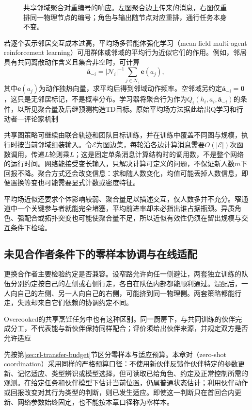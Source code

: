 \begin{figure}[htbp]
 \centering
 
 \caption{共享邻域聚合对重编号的响应。左图聚合边上传来的消息，右图仅重排同一物理节点的编号；角色与输出随节点对应重排，通行任务本身不变。}
 \label{fig:rl-multi-agent-graph}
\end{figure}

若逐个表示邻居交互成本过高，平均场多智能体强化学习（mean field multi-agent reinforcement learning）可用群体或邻域的平均行为近似它们的作用。例如，邻居具有共同离散动作含义且集合非空时，可计算
\[
 \bar{\bm a}_{-i}
 =|\mathcal N_i|^{-1}\sum_{j\in\mathcal N_i}\bm e(a_j),
\]
其中$\bm e(a_j)$为动作独热向量，求平均后得到邻域动作频率。空邻域另约定$\bar{\bm a}_{-i}=\bm0$，这只是无邻居标记，不是概率分布。学习器将聚合行为作为$Q_i(h_i,a_i,\bar{\bm a}_{-i})$的条件，以所见聚合量及后继预测构造TD目标。原始平均场方法据此给出Q学习和行动者—评论家机制

共享图策略可继续由联合轨迹和团队目标训练，并在训练中覆盖不同图与规模，执行时按当前邻域组装输入。令$\mathcal E$为图边集，每轮沿各边计算消息需要$O(|\mathcal E|)$次函数调用，传递$L$轮则乘$L$；这是固定单条消息计算结构时的调用数，不是整个网络的运行时间。网络能接受变长输入，只解决计算可定义的问题，不保证新人数$m$下回报不降。聚合方式还会改变信息：求和随人数变化，均值可能丢掉人数信息，即便置换等变也可能需要显式计数或密度特征。

平均场近似还要求个体影响较弱、聚合量足以描述交互，仅人数多并不充分。窄通道中一个关键参与者就能完全堵塞，平均前进率却未必指出谁占据瓶颈。异质角色、强配合或拓扑突变也可能使聚合量不足，所以近似有效性仍须在留出规模与交互条件下检验。

\subsection{未见合作者条件下的零样本协调与在线适配}
\label{sec:rl-multi-agent-new-partners}

更换合作者主要检验约定是否兼容。设窄路允许向任一侧避让，两套独立训练的队伍分别约定按自己的左侧或右侧行走，各自在队伍内部都能顺利通过。混配后，一人向自己的左侧、另一人向自己的右侧，可能挤到同一物理侧。两套策略都能行走，失败却来自它们依赖的协调约定不同。

Overcooked的共享烹饪任务中也有这种区别。同一厨房下，与共同训练的伙伴完成分工，不代表能与新伙伴保持同样配合；评价须给出伙伴来源，并规定双方是否允许适应

先按第\ref{sec:rl-transfer-budget}节区分零样本与适应预算。本章对（zero-shot coordination）采用同样的严格预算口径：不使用新伙伴反馈作伙伴特定的参数更新、记忆适应、类型辨识或模型选择，但可读取已给角色、约定及正常控制所需的观测。在给定任务和伙伴模型下估计当前位置，仍属普通状态估计；利用伙伴动作或回报改变对其行为类型的判断，则已发生适应。即使这一判断只在首回合内更新、网络参数始终固定，也不能按本章口径称为零样本。

